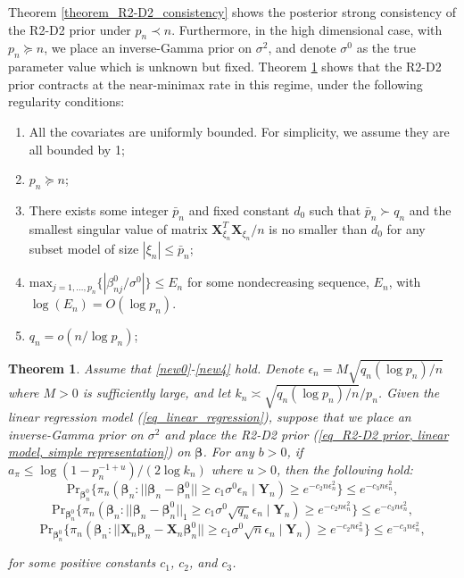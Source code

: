 \documentclass[12pt]{article}
\newtheorem{theorem}{Theorem}
\begin{document}
Theorem \ref{theorem_R2-D2_consistency} shows the posterior strong consistency of the R2-D2 prior  under $p_n\prec n$.
Furthermore,  in the high dimensional case, with $p_n\succeq n$, we place an inverse-Gamma prior on $\sigma^2$, and denote	$\sigma^0$  as the true parameter value  which is unknown but fixed.
Theorem \ref{theorem_new theorem}  shows that the R2-D2 prior  contracts at the near-minimax rate in this regime, under the following regularity conditions:
\begin{enumerate} [label=(B\arabic*)]
		\item \label{new0}  All the covariates are uniformly bounded. For simplicity, we assume they are all bounded by 1;

	\item \label{new1} $p_n\succeq n$;
	\item \label{new3}   There exists some integer $\bar p_n$ and fixed constant $d_0$ such that $\bar p_n\succ q_n  $ and the smallest singular value of matrix $ {\bm X}_{\xi_n}^T {\bm X}_{\xi_n}/n  $ is no smaller than
	$ d_0$ for any subset model of size $|\xi_n| \leq \bar{p}_n$;
		\item \label{new5}  $\text{max}_{j=1,\dots,p_n} \{ |\beta_{nj}^0/\sigma^0| \} \leq E_n$ for some nondecreasing sequence, $E_n$, with $\log(E_n) = O(\log p_n)$.
	\item \label{new4} $q_n = o(n/\log p_n)$;


\end{enumerate}


\begin{theorem}\label{theorem_new theorem}
	Assume that    \ref{new0}-\ref{new4}  hold. Denote $\epsilon_n = M\sqrt{q_n (\log p_n)/n}$  where   $M>0$ is sufficiently large, and let $k_n\asymp  \sqrt{ q_n(\log p_n)/n}/p_n$.
	Given
	the linear regression model (\ref{eq_linear_regression}), suppose that we  place an inverse-Gamma prior  on  $\sigma^2$ and
	place the R2-D2 prior  (\ref{eq_R2-D2 prior, linear model, simple representation})  on $\bm\beta$.
	For any  $b>0$, if
	$a_{\pi}  \leq   {\log\left(1-p_n^{-1+u} \right)} / ({2\log k_n})$
	where $u>0$,
	then the  following hold:
	\[
	\text{Pr}_{\bm\beta^0_n}  \Big\{\pi_n (\bm\beta_n: || \bm\beta_n - \bm\beta^0_n || \geq c_1 \sigma^0  \epsilon_n \mid \bm Y_n ) \geq e^{-c_2 n\epsilon_n^2}   \Big\}  \leq e^{-c_3 n\epsilon_n^2},
	\]
	\[
	\text{Pr}_{\bm\beta^0_n}  \Big\{ \pi_n  (\bm\beta_n: || \bm\beta_n - \bm\beta^0_n ||_1 \geq c_1 \sigma^0  \sqrt{q_n}\epsilon_n \mid \bm Y_n ) \geq e^{-c_2 n\epsilon_n^2}   \Big\}   \leq e^{-c_3 n\epsilon_n^2},
	\]
	\[
	\text{Pr}_{\bm\beta^0_n}  \Big\{ \pi_n  (\bm\beta_n: || \bm X_n\bm\beta_n - \bm X_n \bm\beta^0 _n|| \geq c_1 \sigma^0   \sqrt{n}\epsilon_n \mid \bm Y_n ) \geq e^{-c_2 n\epsilon_n^2}   \Big\}  \leq e^{-c_3 n\epsilon_n^2},
	\]


	for some  positive constants   $c_1$, $c_2$, and  $c_3$.
\end{theorem}
\end{document}
